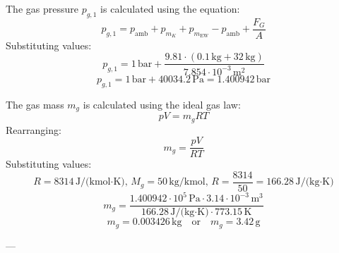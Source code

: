 The gas pressure \( p_{g,1} \) is calculated using the equation:  
\[
p_{g,1} = p_{\text{amb}} + p_{m_K} + p_{m_{\text{EW}}} - p_{\text{amb}} + \frac{F_G}{A}
\]  
Substituting values:  
\[
p_{g,1} = 1 \, \text{bar} + \frac{9.81 \cdot (0.1 \, \text{kg} + 32 \, \text{kg})}{7.854 \cdot 10^{-3} \, \text{m}^2}
\]  
\[
p_{g,1} = 1 \, \text{bar} + 40034.2 \, \text{Pa} = 1.400942 \, \text{bar}
\]  

The gas mass \( m_g \) is calculated using the ideal gas law:  
\[
p V = m_g R T
\]  
Rearranging:  
\[
m_g = \frac{p V}{R T}
\]  
Substituting values:  
\[
R = 8314 \, \text{J/(kmol·K)}, \, M_g = 50 \, \text{kg/kmol}, \, R = \frac{8314}{50} = 166.28 \, \text{J/(kg·K)}
\]  
\[
m_g = \frac{1.400942 \cdot 10^5 \, \text{Pa} \cdot 3.14 \cdot 10^{-3} \, \text{m}^3}{166.28 \, \text{J/(kg·K)} \cdot 773.15 \, \text{K}}
\]  
\[
m_g = 0.003426 \, \text{kg} \quad \text{or} \quad m_g = 3.42 \, \text{g}
\]  

---